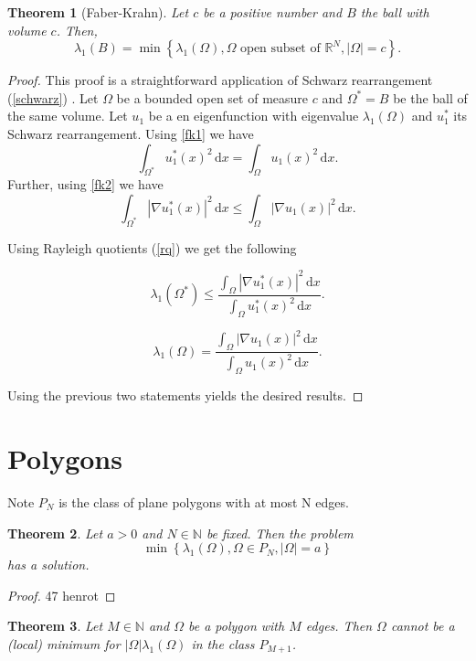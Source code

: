 \documentclass[12pt]{report}
\newtheorem{theorem}{Theorem}[section]
\numberwithin{definition}{section}
\begin{document}
\begin{theorem}[Faber-Krahn] \label{fk}
 Let $c$ be a positive number and $B$ the ball with volume $c$. Then,
 \[
   \lambda_{1}(B) = \min \left\{ \lambda_{1}(\Omega), \Omega \text{ open subset of } \mathbb{R}^{N}, |\Omega| = c \right\} 
 .\] 
\end{theorem}

\begin{proof}
  This proof is a straightforward application of Schwarz rearrangement (\ref{schwarz}) \cite{henrot}.
  Let $\Omega$ be a bounded open set of measure $c$ and $\Omega^* = B$ be the ball of the same volume.
  Let $u_1$ be a en eigenfunction with eigenvalue $\lambda_{1}(\Omega)$ and $u_1^*$ its Schwarz rearrangement.
  Using \ref{fk1} we have
  \[
   \int_{\Omega^{*}} \! u_1^{*}(x)^2 \, \mathrm{d}x = \int_{ \Omega} \! u_1(x)^2 \, \mathrm{d}x
  .\] 
  Further, using \ref{fk2} we have
  \[
     \int_{\Omega^{*}} \! | \nabla u_1^{*}(x) |^2 \, \mathrm{d}x \leq \int_\Omega \! | \nabla u_1(x)  |^2  \, \mathrm{d}x
  .\] 

  Using Rayleigh quotients (\ref{rq}) we get the following

  \[
    \lambda_{1}(\Omega^{*}) \leq \frac{\int_{\Omega} \! | \nabla u_1^{*}(x) |^2 \, \mathrm{d}x }{\int_{\Omega} \! u_1^{*}(x)^2 \, \mathrm{d}x }
  .\] 

  \[
    \lambda_{1}(\Omega) = \frac{\int_{ \Omega} \! | \nabla u_1(x) | ^2 \, \mathrm{d}x }{\int_{ \Omega} \! u_1(x)^2 \, \mathrm{d}x}
  .\] 

  Using the previous two statements yields the desired results.
\end{proof}

\break

\section{Polygons}

Note $P_{N}$ is the class of plane polygons with at most N edges.

\begin{theorem}
  Let $a > 0$ and $N \in \mathbb{N}$ be fixed.
  Then the problem
  \[
    \min \left\{ \lambda_{1}(\Omega), \Omega \in P_{N}, |\Omega| = a \right\} 
  \] 
  has a solution.
\end{theorem}

\begin{proof}
  47 henrot
\end{proof}

\begin{theorem}
  Let $M \in \mathbb{N}$ and $\Omega$ be a polygon with $M$ edges.
  Then $\Omega$ cannot be a (local) minimum for $|\Omega| \lambda_{1}(\Omega)$ in the class $P_{M+1}$.
\end{theorem}
\end{document}
